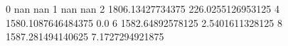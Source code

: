 0 nan nan
1 nan nan
2 1806.13427734375 226.0255126953125
4 1580.1087646484375 0.0
6 1582.64892578125 2.5401611328125
8 1587.281494140625 7.1727294921875
